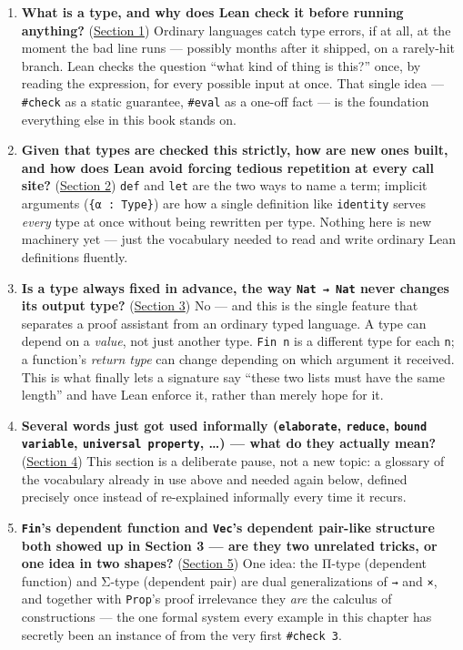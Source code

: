 \begin{enumerate}
\def\labelenumi{\arabic{enumi}.}
\tightlist
\item
  \textbf{What is a type, and why does Lean check it before running anything?} (\hyperref[sec:01-basics:01-everything-has-a-type:1]{Section 1}) Ordinary languages catch type errors, if at all, at the moment the bad line runs --- possibly months after it shipped, on a rarely-hit branch. Lean checks the question ``what kind of thing is this?'' once, by reading the expression, for every possible input at once. That single idea --- \texttt{\#check} as a static guarantee, \texttt{\#eval} as a one-off fact --- is the foundation everything else in this book stands on.
\item
  \textbf{Given that types are checked this strictly, how are new ones built, and how does Lean avoid forcing tedious repetition at every call site?} (\hyperref[sec:01-basics:02-def-let-implicit:1]{Section 2}) \texttt{def} and \texttt{let} are the two ways to name a term; implicit arguments (\texttt{\{α : Type\}}) are how a single definition like \texttt{identity} serves \emph{every} type at once without being rewritten per type. Nothing here is new machinery yet --- just the vocabulary needed to read and write ordinary Lean definitions fluently.
\item
  \textbf{Is a type always fixed in advance, the way \texttt{Nat → Nat} never changes its output type?} (\hyperref[sec:01-basics:03-dependent-types:1]{Section 3}) No --- and this is the single feature that separates a proof assistant from an ordinary typed language. A type can depend on a \emph{value}, not just another type. \texttt{Fin n} is a different type for each \texttt{n}; a function's \emph{return type} can change depending on which argument it received. This is what finally lets a signature say ``these two lists must have the same length'' and have Lean enforce it, rather than merely hope for it.
\item
  \textbf{Several words just got used informally (\texttt{elaborate}, \texttt{reduce}, \texttt{bound variable}, \texttt{universal property}, \ldots) --- what do they actually mean?} (\hyperref[sec:01-basics:04-terminology:1]{Section 4}) This section is a deliberate pause, not a new topic: a glossary of the vocabulary already in use above and needed again below, defined precisely once instead of re-explained informally every time it recurs.
\item
  \textbf{\texttt{Fin}'s dependent function and \texttt{Vec}'s dependent pair-like structure both showed up in Section 3 --- are they two unrelated tricks, or one idea in two shapes?} (\hyperref[sec:01-basics:05-pi-sigma-and-coc:1]{Section 5}) One idea: the Π-type (dependent function) and Σ-type (dependent pair) are dual generalizations of \texttt{→} and \texttt{×}, and together with \texttt{Prop}'s proof irrelevance they \emph{are} the calculus of constructions --- the one formal system every example in this chapter has secretly been an instance of from the very first \texttt{\#check 3}.
\end{enumerate}

